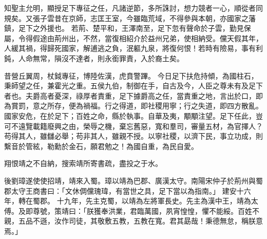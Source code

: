 \begin{pinyinscope}
 
知聖主允明，顯授足下專征之任，凡諸逆節，多所誅討，想力競者一心，順從者同規矣。又張子雲昔在京師，志匡王室，今雖臨荒域，不得參與本朝，亦國家之藩鎮，足下之外援也。
 若荊、楚平和，王澤南至，足下忽有聲命於子雲，勤見保屬，令得假途由荊州出，不然，當復相紹介於益州兄弟，使相納受。儻天假其年，人緩其禍，得歸死國家，解逋逃之負，泯軀九泉，將復何恨！若時有險易，事有利鈍，人命無常，隕沒不達者，則永銜罪責，入於裔土矣。
 
 
昔營丘翼周，杖鉞專征，博陸佐漢，虎賁警蹕。
 今日足下扶危持傾，為國柱石，秉師望之任，兼霍光之重。五侯九伯，制御在手，自古及今，人臣之尊未有及足下者也。夫爵高者憂深，祿厚者責重，足下據爵高之任，當責重之地，言出於口，即為賞罰，意之所存，便為禍福。行之得道，即社稷用寧；行之失道，即四方散亂。國家安危，在於足下；百姓之命，縣於執事。自華及夷，顒顒注望。足下任此，豈可不遠覽載籍廢興之由，榮辱之機，棄忘舊惡，寬和羣司，審量五材，為官擇人？苟得其人，雖讎必舉；苟非其人，雖親不授。以寧社稷，以濟下民，事立功成，則繫音於管絃，勒勳於金石，願君勉之！為國自重，為民自愛。
 
 
 
 
 翔恨靖之不自納，搜索靖所寄書疏，盡投之于水。
 
 
後劉璋遂使使招靖，靖來入蜀。璋以靖為巴郡、廣漢太守。南陽宋仲子於荊州與蜀郡太守王商書曰：「文休倜儻瑰瑋，有當世之具，足下當以為指南。」
 建安十六年，轉在蜀郡。
 十九年，先主克蜀，以靖為左將軍長史。先主為漢中王，靖為太傅。及即尊號，策靖曰：「朕獲奉洪業，君臨萬國，夙宵惶惶，懼不能綏。百姓不親，五品不遜，汝作司徒，其敬敷五教，五教在寬。君其勗哉！秉德無怠，稱朕意焉。」
 

\end{pinyinscope}
